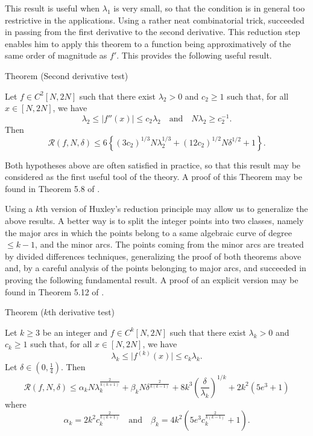This result is useful when $\lambda_1$ is very small, so that the condition is
in general too restrictive in the applications. Using a rather neat
combinatorial trick,
\cite{Huxley*96}
succeeded in passing from the first
derivative to the second derivative. This reduction step enables him to apply
this theorem to a function being approximatively of the same order of
magnitude as $f'$. This provides the following useful result.   

\begin{thm}{Theorem (Second derivative test)}

Let $f \in C^2[N,2N]$ such that there exist $\lambda_2 >0$ and $c_2 \geqslant
  1$ such that, for all $x \in [N,2N]$, we have 
$$
   \lambda_2 \leqslant \bigl | f''(x) \bigr | \leqslant c_2 \lambda_2
  \quad\text{and}\quad N \lambda_2 \geqslant c_2^{-1}.
$$
Then
$$\mathcal {R}(f,N,\delta) \leqslant 6 \left\lbrace \left( 3 c_2 \right)^{1/3} N \lambda_2^{1/3} + \left(12 c_2 \right)^{1/2} N \delta^{1/2} + 1 \right\rbrace.$$
\end{thm}


Both hypotheses above are often satisfied in practice, so that this result may
be considered as the first useful tool of the theory. A proof of
this Theorem may be found in Theorem 5.8 of
\cite{Bordelles*12}.


Using a $k$th version of Huxley's reduction principle may allow us to
generalize the above results. A better way is to split the integer points into
two classes, namely the major arcs in which the points belong to a
same algebraic curve of degree $\le k-1$, and the minor arcs. The points
coming from the minor arcs are treated by divided differences techniques,
generalizing the proof of both theorems above and, by a careful analysis of the
points belonging to major arcs,
\cite{Huxley-Sargos*95}
and
\cite{Huxley-Sargos*06}
succeeded in
proving the following fundamental result. A proof of an explicit version may
be found in Theorem 5.12 of
\cite{Bordelles*12}.

\begin{thm}{Theorem ($k$th derivative test)}

Let $k \geqslant 3$ be an integer and $f \in C^k [N,2N]$ such that there exist
  $\lambda_k >0$ and $c_k \geqslant 1$ such that, for all $x \in [N,2N]$, we
  have 
$$
   \lambda_k \leqslant \bigl | f^{(k)}(x) \bigr | \leqslant c_k \lambda_k. \label{e4}
$$
Let $\delta \in \left( 0,\frac{1}{4} \right)$. Then
$$
  \mathcal {R}(f,N,\delta) \leqslant \alpha_k N \lambda_k^{\frac{2}{k(k+1)}} +
  \beta_k N \delta^{\frac{2}{k(k-1)}} + 8k^3 \left( \frac{\delta}{\lambda_k}
  \right)^{1/k} + 2 k^2 \left( 5e^3 + 1 \right)
  $$
where
$$
  \alpha_k = 2k^2 c_k^{\frac{2}{k(k+1)}} \quad \text{and} \quad \beta_k = 4
  k^2 \left( 5 e^3 c_k^{\frac{2}{k(k-1)}} + 1 \right).
  $$
\end{thm}





